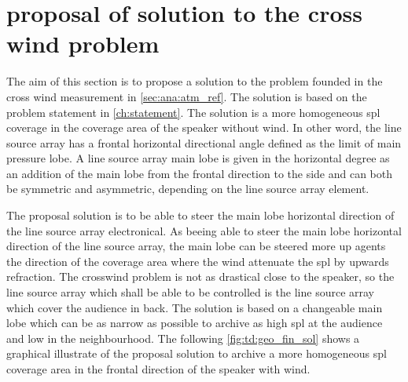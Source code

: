 \section{proposal of solution to the cross wind problem}\label{sec:td:pro_sol_pro}

The aim of this section is to propose a solution to the problem founded in the cross wind measurement in \autoref{sec:ana:atm_ref}. The solution is based on the problem statement in \autoref{ch:statement}. The solution is a more homogeneous \gls{spl} coverage in the coverage area of the speaker without wind. In other word, the line source array has a frontal horizontal directional angle defined as the  limit of main pressure lobe. A line source array main lobe is given in the horizontal degree as an addition of the main lobe from the frontal direction to the side  and can both be symmetric and asymmetric, depending on the line source array element.

The proposal solution is to be able to steer the main lobe horizontal direction of the line source array electronical. As beeing able to steer the main lobe horizontal direction of the line source array, the main lobe can be steered more up agents the direction of the coverage area where the wind attenuate the \gls{spl} by upwards refraction.  The crosswind problem is not as drastical close to the speaker, so the line source array which shall be able to be controlled is the line source array which cover the audience in back. The solution is based on a changeable main lobe which can be as narrow as possible to archive as high \gls{spl} at the audience and low in the neighbourhood. The following \autoref{fig:td:geo_fin_sol} shows a graphical illustrate of the proposal solution to archive a more homogeneous \gls{spl} coverage area in the frontal direction of the speaker with wind.


